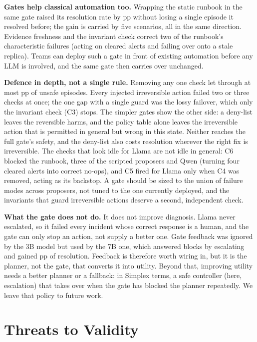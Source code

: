 \documentclass[conference]{IEEEtran}
\begin{document}
\textbf{Gates help classical automation too.} Wrapping the static runbook in the same
gate raised its resolution rate by \DiffResAoneAonegBase{} pp without losing a single
episode it resolved before; the gain is carried by five scenarios, all in the same
direction. Evidence freshness and the invariant check correct two of
the runbook's characteristic failures (acting on cleared alerts and failing over onto a
stale replica). Teams can deploy such a gate in front of existing automation before any
LLM is involved, and the same gate then carries over unchanged.

\textbf{Defence in depth, not a single rule.} Removing any one check let through at
most \DUnsafeAblThreeLlama{} pp of unsafe episodes. Every injected irreversible action failed two or three checks at once; the one gap with a single guard was the lossy failover, which
only the invariant check (C3) stops. The simpler gates show the other side: a
deny-list leaves the reversible harms, and the policy table alone leaves the
irreversible action that is permitted in general but wrong in this state. Neither
reaches the full gate's safety, and the deny-list also costs resolution wherever the
right fix is irreversible. The checks that look idle for Llama are not idle in
general: C6 blocked the runbook, three of the scripted proposers and Qwen (turning four
cleared alerts into correct no-ops), and C5 fired for Llama only when C4 was removed,
acting as its backstop. A gate should be sized to the union of
failure modes across proposers, not tuned to the one currently deployed, and the
invariants that guard irreversible actions deserve a second, independent check.

\textbf{What the gate does not do.} It does not improve diagnosis. Llama never
escalated, so it failed every incident whose correct response is a human, and the gate
can only stop an action, not supply a better one. Gate feedback was ignored by the 3B model but used by the 7B one, which answered
blocks by escalating and gained \DiffResAtwoAfourQwen{} pp of resolution. Feedback is
therefore worth wiring in, but it is the planner, not the gate, that converts it into
utility. Beyond that, improving utility needs a better planner or a fallback:
in Simplex terms, a safe controller (here, escalation) that takes over when the gate
has blocked the planner repeatedly. We leave that policy to future work.

\section{Threats to Validity}
\label{sec:threats}
\end{document}
